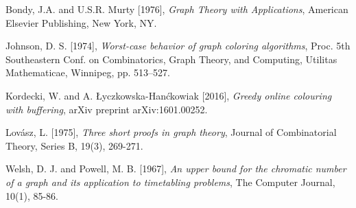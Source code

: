 \documentclass{article}
\begin{document}
\newpage

\begin{thebibliography}{9}
Bondy, J.A. and U.S.R. Murty [1976],
\emph{Graph Theory with Applications},
American Elsevier Publishing, New York, NY.

Johnson, D. S. [1974], \emph{Worst-case behavior of graph coloring algorithms}, Proc. 5th Southeastern Conf. on Combinatorics, Graph Theory, and Computing, Utilitas Mathematicae, Winnipeg, pp. 513–527.

Kordecki, W. and A. Łyczkowska-Hanćkowiak [2016], \emph{Greedy online colouring with buffering}, arXiv preprint arXiv:1601.00252.

Lovász, L. [1975], \emph{Three short proofs in graph theory}, Journal of Combinatorial Theory, Series B, 19(3), 269-271.

Welsh, D. J. and Powell, M. B. [1967], \emph{An upper bound for the chromatic number of a graph and its application to timetabling problems}, The Computer Journal, 10(1), 85-86.

\end{thebibliography}
\end{document}
